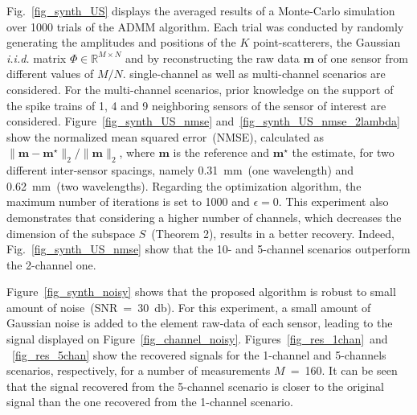 \documentclass{article}
\newcommand{\vect}[1]{\bm{#1}}
\newcommand{\mat}[1]{\mathsf{#1}}
\theoremstyle{definition}
\begin{document}
Fig.~\ref{fig_synth_US} displays the averaged results of a Monte-Carlo simulation over \num{1000} trials of the ADMM algorithm. 
Each trial was conducted by randomly generating the amplitudes and positions of the $K$ point-scatterers, the Gaussian \textit{i.i.d.} matrix $\mat{\Phi} \in \mathbb{R}^{M \times N}$ and by reconstructing the raw data $\vect{m}$ of one sensor from different values of $M/N$. single-channel as well as multi-channel scenarios are considered. 
For the multi-channel scenarios, prior knowledge on the support of the spike trains of \num{1}, \num{4} and \num{9} neighboring sensors of the sensor of interest are considered. 
Figure~\ref{fig_synth_US_nmse} and~\ref{fig_synth_US_nmse_2lambda} show the normalized mean squared error~(NMSE), calculated as $\| \vect{m} - \vect{m}^\star \|_2 / \| \vect{m}\|_2$, where $\vect{m}$ is the reference and $\vect{m}^\star$ the estimate, for two different inter-sensor spacings, namely \SI{0.31}{\milli\metre}~(one wavelength) and \SI{0.62}{\milli\metre}~(two wavelengths). 
Regarding the optimization algorithm, the maximum number of iterations is set to \num{1000} and $\epsilon = 0$. 
This experiment also demonstrates that considering a higher number of channels, which decreases the dimension of the subspace $S$~(Theorem 2), results in a better recovery. Indeed, Fig.~\ref{fig_synth_US_nmse} show that the 10- and 5-channel scenarios outperform the 2-channel one.

Figure~\ref{fig_synth_noisy} shows that the proposed algorithm is robust to small amount of noise~(SNR~=~\SI{30}{\decibel}). 
For this experiment, a small amount of Gaussian noise is added to the element raw-data of each sensor, leading to the signal displayed on Figure~\ref{fig_channel_noisy}. Figures~\ref{fig_res_1chan}~and ~\ref{fig_res_5chan} show the recovered signals for the \num{1}-channel and \num{5}-channels scenarios, respectively, for a number of measurements $M$~=~\num{160}. 
It can be seen that the signal recovered from the \num{5}-channel scenario is closer to the original signal than the one recovered from the \num{1}-channel scenario.
\end{document}
